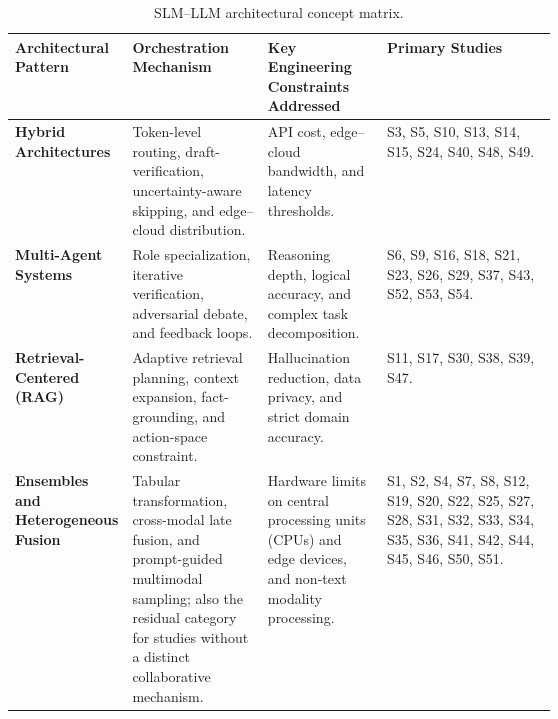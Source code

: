 \begin{table}[!htbp]
\centering
\caption{SLM--LLM architectural concept matrix.}
\label{tab:concept-matrix}
\footnotesize
\setlength{\tabcolsep}{3pt}
\renewcommand{\arraystretch}{1.08}
\begin{tabularx}{\linewidth}{
  @{}
  >{\raggedright\arraybackslash}p{0.16\linewidth}
  >{\raggedright\arraybackslash}p{0.25\linewidth}
  >{\raggedright\arraybackslash}p{0.22\linewidth}
  >{\raggedright\arraybackslash}X
  @{}
}
\toprule
\textbf{Architectural Pattern} &
\textbf{Orchestration Mechanism} &
\textbf{Key Engineering Constraints Addressed} &
\textbf{Primary Studies} \\
\midrule
\textbf{Hybrid Architectures} &
Token-level routing, draft-verification, uncertainty-aware skipping, and edge--cloud distribution. &
API cost, edge--cloud bandwidth, and latency thresholds. &
\mbox{S3}, \mbox{S5}, \mbox{S10}, \mbox{S13}, \mbox{S14}, \mbox{S15}, \mbox{S24}, \mbox{S40}, \mbox{S48}, \mbox{S49}. \\

\textbf{Multi-Agent Systems} &
Role specialization, iterative verification, adversarial debate, and feedback loops. &
Reasoning depth, logical accuracy, and complex task decomposition. &
\mbox{S6}, \mbox{S9}, \mbox{S16}, \mbox{S18}, \mbox{S21}, \mbox{S23}, \mbox{S26}, \mbox{S29}, \mbox{S37}, \mbox{S43}, \mbox{S52}, \mbox{S53}, \mbox{S54}. \\

\textbf{Retrieval-Centered (RAG)} &
Adaptive retrieval planning, context expansion, fact-grounding, and action-space constraint. &
Hallucination reduction, data privacy, and strict domain accuracy. &
\mbox{S11}, \mbox{S17}, \mbox{S30}, \mbox{S38}, \mbox{S39}, \mbox{S47}. \\

\textbf{Ensembles and Heterogeneous Fusion} &
Tabular transformation, cross-modal late fusion, and prompt-guided multimodal sampling; also the residual category for studies without a distinct collaborative mechanism. &
Hardware limits on central processing units (CPUs) and edge devices, and non-text modality processing. &
\mbox{S1}, \mbox{S2}, \mbox{S4}, \mbox{S7}, \mbox{S8}, \mbox{S12}, \mbox{S19}, \mbox{S20}, \mbox{S22}, \mbox{S25}, \mbox{S27}, \mbox{S28}, \mbox{S31}, \mbox{S32}, \mbox{S33}, \mbox{S34}, \mbox{S35}, \mbox{S36}, \mbox{S41}, \mbox{S42}, \mbox{S44}, \mbox{S45}, \mbox{S46}, \mbox{S50}, \mbox{S51}. \\
\bottomrule
\end{tabularx}
\end{table}

